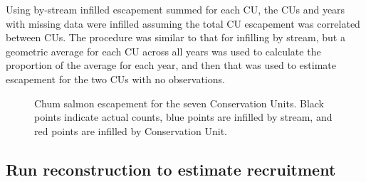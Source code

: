 \documentclass[11pt]{book}
\begin{document}
Using by-stream infilled escapement summed for each CU, the CUs and years with missing data were infilled assuming the total CU escapement was correlated between CUs. The procedure was similar to that for infilling by stream, but a geometric average for each CU across all years was used to calculate the proportion of the average for each year, and then that was used to estimate escapement for the two CUs with no observations.
\begin{figure}[htb]

{\centering {} 

}

\caption{Chum salmon escapement for the seven Conservation Units. Black points indicate actual counts, blue points are infilled by stream, and red points are infilled by Conservation Unit.}\label{fig:chum-escapement-infill}
\end{figure}
\hypertarget{run-reconstruction-to-estimate-recruitment}{%
\subsection{Run reconstruction to estimate recruitment}\label{run-reconstruction-to-estimate-recruitment}}
\end{document}
